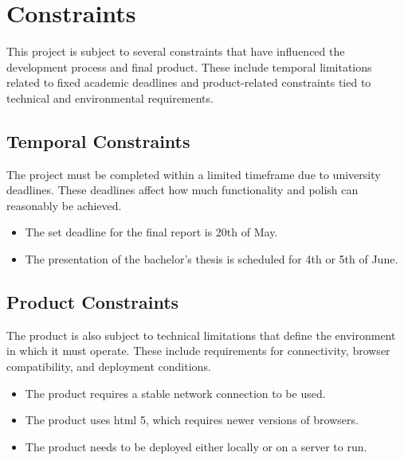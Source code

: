 \section{Constraints}

This project is subject to several constraints that have influenced the development process and final product. These include temporal limitations related to fixed academic deadlines and product-related constraints tied to technical and environmental requirements.

\subsection{Temporal Constraints}

The project must be completed within a limited timeframe due to university deadlines. These deadlines affect how much functionality and polish can reasonably be achieved.

\begin{itemize}
    \item The set deadline for the final report is 20th of May.
    \item The presentation of the bachelor's thesis is scheduled for 4th or 5th of June.
\end{itemize}

\subsection{Product Constraints}

The product is also subject to technical limitations that define the environment in which it must operate. These include requirements for connectivity, browser compatibility, and deployment conditions.

\begin{itemize}
    \item The product requires a stable network connection to be used.
    \item The product uses \acrshort{html} 5, which requires newer versions of browsers.
    \item The product needs to be deployed either locally or on a server to run.
\end{itemize}

